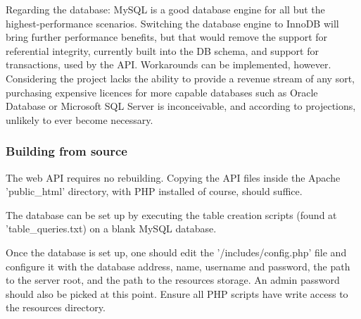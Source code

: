 	Regarding the database: MySQL is a good database engine for all but the
	highest-performance scenarios. Switching the database engine to InnoDB will
	bring further performance benefits, but that would remove the support for 
	referential integrity, currently built into the DB schema, and support for
	transactions, used by the API. Workarounds can be implemented, however.
	Considering the project lacks the ability to provide a revenue stream
	of any sort, purchasing expensive licences for more capable databases such
	as Oracle Database or Microsoft SQL Server is inconceivable, and according
	to projections, unlikely to ever become necessary.

    \subsubsection{Building from source}
	The web API requires no rebuilding. Copying the API files inside the Apache
	'public_html' directory, with PHP installed of course, should suffice.
	
	The database can be set up by executing the table creation scripts 
	(found at 'table_queries.txt) on a blank MySQL database.
	
	Once the database is set up, one should edit the '/includes/config.php' file
	and configure it with the database address, name, username and password,
	the path to the server root, and the path to the resources storage.
	An admin password should also be picked at this point. 
	Ensure all PHP scripts have write access to the resources directory.

